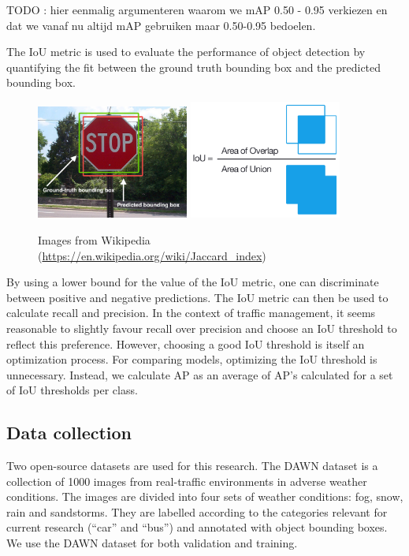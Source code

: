 \documentclass[]{article}
\begin{document}
TODO : hier eenmalig argumenteren waarom we mAP 0.50 - 0.95 verkiezen en dat we vanaf nu altijd mAP gebruiken maar 0.50-0.95 bedoelen.

	The IoU metric is used to evaluate the performance of object detection by quantifying the fit between the ground truth bounding box and the predicted bounding box.
	
	\begin{figure}[h]
		\centering
		\includegraphics[width=5cm]{Intersection_over_Union_-_object_detection_bounding_boxes.jpg}
		\includegraphics[width=5cm]{Intersection_over_Union_-_visual_equation.png}
		\caption{Images from Wikipedia \footnotesize{(\url{https://en.wikipedia.org/wiki/Jaccard_index})}}
	\end{figure}
	
	By using a lower bound for the value of the IoU metric, one can discriminate between positive and negative predictions. The IoU metric can then be used to calculate recall and precision. In the context of traffic management, it seems reasonable to slightly favour recall over precision and choose an IoU threshold to reflect this preference. However, choosing a good IoU threshold is itself an optimization process. For comparing models, optimizing the IoU threshold is unnecessary. Instead, we calculate AP as an average of AP's calculated for a set of IoU thresholds per class.

\subsection{Data collection}

	Two open-source datasets are used for this research. The DAWN dataset \cite{bw1x-yh39-20} is a collection of 1000 images from real-traffic environments in adverse weather conditions. The images are divided into four sets of weather conditions: fog, snow, rain and sandstorms. They are labelled according to the categories relevant for current research (``car'' and ``bus'') and annotated with object bounding boxes. We use the DAWN dataset for both validation and training.
	
\end{document}
